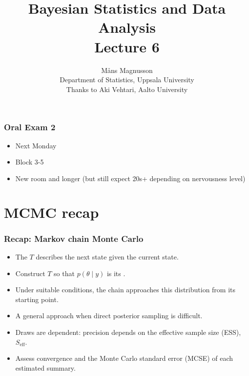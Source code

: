 \documentclass[10pt]{beamer}
\title[]{{\color{black}Bayesian Statistics and Data Analysis \\ Lecture 6}}
\author[]{M{\aa}ns Magnusson \\ Department of Statistics, Uppsala University \\ Thanks to Aki Vehtari, Aalto University}
\date{}
\begin{document}
\frame{\titlepage
}


\begin{frame}

\frametitle{Oral Exam 2}

 \begin{itemize}
    \item Next Monday
    \item Block 3-5
    \item New room and longer (but still expect 20s+ depending on nervousness level)
  \end{itemize}

\end{frame}

\section{MCMC recap}

\begin{frame}
\frametitle{Recap: Markov chain Monte Carlo}

\begin{itemize}
\item The  $T$ describes the next state
  given the current state.
\item Construct $T$ so that $p(\theta\mid y)$ is its
  .
\pause
\item Under suitable conditions, the chain approaches this distribution
  from its starting point.
\item[+] A general approach when direct posterior sampling is difficult.
\pause
\item[-] Draws are dependent: precision depends on the
  effective sample size (ESS), $S_{\mathrm{eff}}$.
\item[-] Assess convergence and the Monte Carlo standard error (MCSE)
  of each estimated summary.
\end{itemize}

\end{frame}
\end{document}
